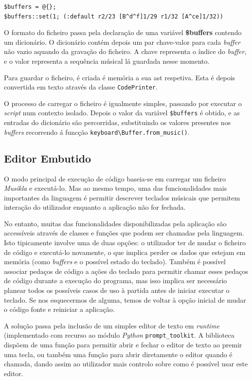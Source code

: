 \begin{lstlisting}[caption={Formato do ficheiro de gravação dos \textit{buffers}.}]
$buffers = @{};
$buffers::set(1; (:default r2/23 [B^d^f]1/29 r1/32 [A^ce]1/32))
\end{lstlisting}

O formato do ficheiro passa pela declaração de uma variável \textbf{\$buffers} contendo um dicionário. O dicionário contém depois um par chave-valor para cada \textit{buffer} não vazio aquando da gravação do ficheiro. A chave representa o índice do \textit{buffer}, e o valor representa a sequência músical lá guardada nesse momento.

Para guardar o ficheiro, é criada é memória a sua \acrshort{ast} respetiva. Esta é depois convertida em texto através da classe \texttt{CodePrinter}.

O processo de carregar o ficheiro é igualmente simples, passando por executar o \textit{script} num contexto isolado. Depois o valor da variável \texttt{\$buffers} é obtido, e as entradas do dicionário são percorridas, substituindo os valores presentes nos \textit{buffers} recorrendo á funcção \texttt{keyboard\textbackslash{}Buffer.from\_music()}.

\subsection{Editor Embutido}
O modo principal de execução de código baseia-se em carregar um ficheiro \textit{Musikla} e executá-lo. Mas ao mesmo tempo, uma das funcionalidades mais importantes da linguagem é permitir descrever teclados músicais que permitem interação do utilizador enquanto a aplicação não for fechada.

No entanto, muitas das funcionalidades disponibilizadas pela aplicação são accessíveis através de classes e funções que podem ser chamadas pela linguagem. Isto tipicamente involve uma de duas opções: o utilizador ter de mudar o ficheiro de código e executá-lo novamente, o que implica perder os dados que estejam em memória (como \textit{buffers} e o possível estado do teclado). Também é possível associar pedaços de código a ações do teclado para permitir chamar esses pedaços de código durante a execução do programa, mas isso implica ser necessário planear todos os possíveis casos de uso à partida antes de iniciar executar o teclado. Se nos esquecermos de alguma, temos de voltar à opção inicial de mudar o código fonte e reiniciar a aplicação.

A solução passa pela inclusão de um simples editor de texto em \textit{runtime} (implementado com recurso ao módulo \textit{Python} \texttt{prompt\_toolkit}. A biblioteca dispõem de uma função para permitir abrir e fechar o editor de texto ao premir uma tecla, ou também uma função para abrir diretamente o editor quando é chamada, dando assim ao utilizador mais controlo sobre como é possível usar este editor.

